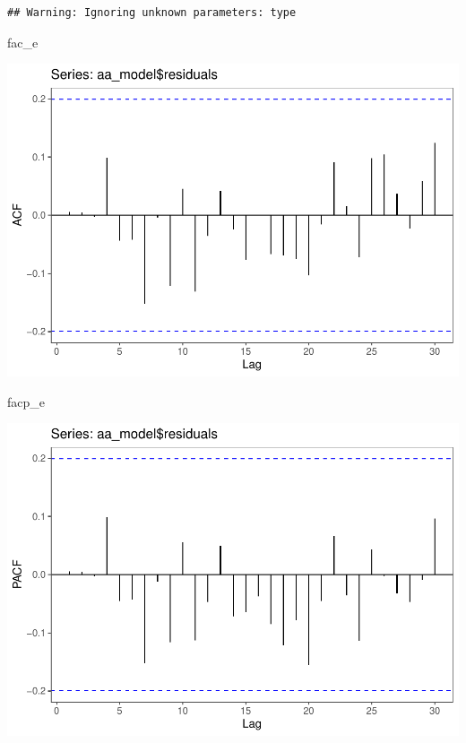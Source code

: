 \documentclass[]{article}
\newenvironment{Shaded}{\begin{snugshade}}{\end{snugshade}}
\newcommand{\NormalTok}[1]{#1}
\begin{document}
\begin{verbatim}
## Warning: Ignoring unknown parameters: type
\end{verbatim}

\begin{Shaded}
\begin{Highlighting}[]
\NormalTok{fac_e}
\end{Highlighting}
\end{Shaded}

\includegraphics{Econo2_P5_files/figure-latex/estimation autoarima-1.pdf}

\begin{Shaded}
\begin{Highlighting}[]
\NormalTok{facp_e}
\end{Highlighting}
\end{Shaded}

\includegraphics{Econo2_P5_files/figure-latex/estimation autoarima-2.pdf}
\end{document}
